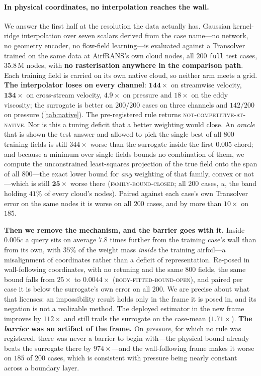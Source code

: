 \paragraph{In physical coordinates, no interpolation reaches the wall.} We answer the first
half at the resolution the data actually has. Gaussian
kernel-ridge interpolation over seven scalars derived from the case name---no network, no
geometry encoder, no flow-field learning---is evaluated against a Transolver trained on the
same data at AirfRANS's own cloud nodes, all $200$ \texttt{full} test cases, $35.8$\,M nodes, with
\textbf{no rasterisation anywhere in the comparison path}. Each training field is carried
on its own native cloud, so neither arm meets a grid. \textbf{The interpolator loses on
every channel}: $\mathbf{144\times}$ on streamwise velocity, $\mathbf{134\times}$ on
cross-stream velocity, $\mathbf{4.9\times}$ on pressure and $18\times$ on the eddy
viscosity; the surrogate is better on
$200/200$ cases on three channels and $142/200$ on pressure (\autoref{tab:native}). The
pre-registered rule returns \textsc{not-competitive-at-native}. Nor is this a tuning
deficit that a better weighting would close. An \emph{oracle} that is shown the test answer
and allowed to pick the single best of all $800$ training fields is still $344\times$
worse than the surrogate inside the first $0.005$ chord; and because a minimum over single
fields bounds no combination of them, we compute the unconstrained least-squares
projection of the true field onto the span of all $800$---the exact lower bound for
\emph{any} weighting of that family, convex or not---which is still $\mathbf{25\times}$
worse there (\textsc{family-bound-closed}; all $200$ cases, $u$, the band holding $41\%$ of
every cloud's nodes). Paired against each case's own Transolver error on the same nodes it
is worse on all $200$ cases, and by more than $10\times$ on $185$.

\textbf{Then we remove the mechanism, and the barrier goes with it.} Inside $0.005c$ a
query sits on average $7.8$ times further from the training case's wall than from its own,
with $35\%$ of the weight mass \emph{inside} the training airfoil---a misalignment of
coordinates rather than a deficit of representation. Re-posed in wall-following
coordinates, with no retuning and the same $800$ fields, the same bound falls from
$25\times$ to $\mathbf{0.0044\times}$ (\textsc{body-fitted-bound-open}), and paired per
case it is below the surrogate's own error on all $200$. We are precise about what that
licenses: an impossibility result holds only in the frame it is posed in, and its negation
is not a realizable method. The deployed estimator in the new frame improves by $112\times$
and still trails the surrogate on the case-mean ($1.71\times$). \textbf{The \emph{barrier}
was an artifact of the frame.} On \emph{pressure}, for which no rule was registered, there
was never a barrier to begin with---the physical bound already beats the surrogate there by
$974\times$---and the wall-following frame makes it worse on $185$ of $200$ cases, which is
consistent with pressure being nearly constant across a boundary layer.

